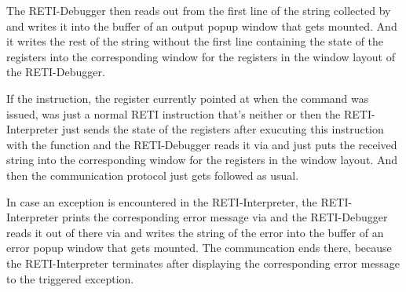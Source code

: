 \documentclass{report}
\begin{document}
The RETI-Debugger then reads out  from the first line of the  string collected by  and writes it into the buffer of an output popup window that gets mounted. And it writes the rest of the  string without the first line containing the state of the registers into the corresponding window for the registers in the window layout of the RETI-Debugger.

If the instruction, the  register currently pointed at when the  command was issued, was just a normal RETI instruction that's neither  or  then the RETI-Interpreter just sends the state of the registers after exucuting this instruction with the  function and the RETI-Debugger reads it via  and just puts the received  string into the corresponding window for the registers in the window layout. And then the communication protocol just gets followed as usual.


In case an exception is encountered in the RETI-Interpreter, the RETI-Interpreter prints the corresponding error message via  and the RETI-Debugger reads it out of there via  and writes the  string of the error into the buffer of an error popup window that gets mounted. The communcation ends there, because the RETI-Interpreter terminates after displaying the corresponding error message to the triggered exception.

\end{document}
